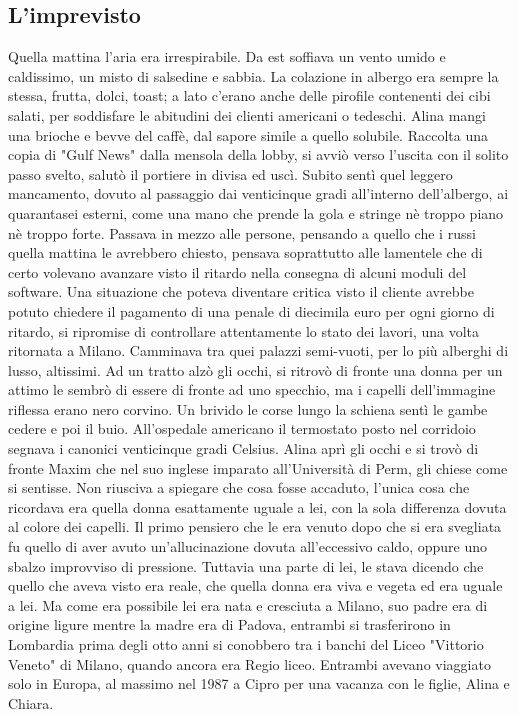 \subsection*{L'imprevisto}
Quella mattina l'aria era irrespirabile. Da est soffiava un vento umido e caldissimo, un
misto di salsedine e sabbia. La colazione in albergo era sempre la stessa, frutta, dolci, toast; a lato c'erano anche delle pirofile contenenti dei cibi salati, per soddisfare le abitudini dei clienti americani o tedeschi. Alina mangi una brioche e bevve del caffè, dal sapore simile a quello solubile.
Raccolta una copia di "Gulf News" dalla mensola della lobby, si avviò verso l'uscita con il solito passo svelto, salutò il portiere in divisa ed uscì.
Subito sentì quel leggero mancamento, dovuto al passaggio dai venticinque gradi all'interno dell'albergo, ai quarantasei esterni, come una mano che prende la gola e stringe nè troppo piano nè troppo forte.
Passava in mezzo alle persone, pensando a quello che i russi quella mattina le avrebbero chiesto, pensava soprattutto alle lamentele che di certo volevano avanzare visto il ritardo nella consegna di alcuni moduli del software. Una situazione che poteva diventare critica visto il cliente avrebbe potuto chiedere il pagamento di una penale di diecimila euro per ogni giorno di ritardo, si ripromise di controllare attentamente lo stato dei lavori, una volta ritornata a Milano. Camminava tra quei palazzi semi-vuoti, per lo più alberghi di lusso, altissimi. Ad un tratto alzò gli occhi, si ritrovò di fronte una donna per un attimo le sembrò di essere di fronte ad uno specchio, ma i capelli dell'immagine riflessa erano nero corvino. Un brivido le corse lungo la schiena sentì le gambe cedere e poi il buio.\newline
All'ospedale americano il termostato posto nel corridoio segnava i canonici venticinque gradi Celsius. Alina aprì gli occhi e si trovò di fronte Maxim che nel suo inglese imparato all'Università  di Perm, gli chiese come si sentisse. Non riusciva a spiegare che cosa fosse accaduto, l'unica cosa che ricordava era quella donna esattamente uguale a lei, con la sola differenza dovuta al colore dei capelli. Il primo pensiero che le era venuto dopo che si era svegliata fu quello di aver avuto un'allucinazione dovuta all'eccessivo caldo, oppure uno sbalzo improvviso di pressione. Tuttavia una parte di lei, le stava dicendo che quello che aveva visto era reale, che quella donna era viva e vegeta ed era uguale a lei.\newline
Ma come era possibile lei era nata e cresciuta a Milano, suo padre era di origine ligure mentre la madre era di Padova, entrambi si trasferirono in Lombardia prima degli otto anni si conobbero tra i banchi del Liceo "Vittorio Veneto" di Milano, quando ancora era Regio liceo. Entrambi avevano viaggiato solo in Europa, al massimo nel 1987 a Cipro per una vacanza con le figlie, Alina e Chiara.\newline
